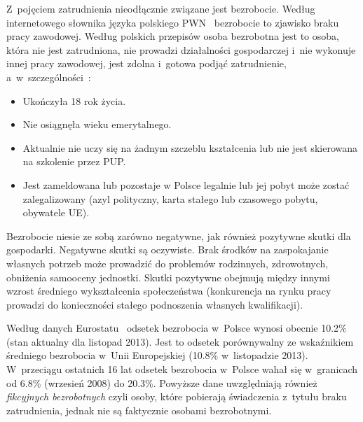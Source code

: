 \documentclass[12pt]{article}
\begin{document}
    Z~pojęciem zatrudnienia nieodłącznie związane jest bezrobocie. Według internetowego słownika języka polskiego PWN~\cite{sjp} bezrobocie to zjawisko braku pracy zawodowej. Według polskich przepisów osoba bezrobotna jest to osoba, która nie jest zatrudniona, nie prowadzi działalności gospodarczej i~nie wykonuje innej pracy zawodowej, jest zdolna i~gotowa podjąć zatrudnienie, a~w~szczególności~\cite{ust:pro:zat}:
    
    \begin{itemize}
        \item Ukończyła 18 rok życia.
        \item Nie osiągnęła wieku emerytalnego.
        \item Aktualnie nie uczy się na żadnym szczeblu kształcenia lub nie jest skierowana na szkolenie przez PUP.
        \item Jest zameldowana lub pozostaje w Polsce legalnie lub jej pobyt może zostać zalegalizowany (azyl polityczny, karta stałego lub czasowego pobytu, obywatele UE).
    \end{itemize}
    
    Bezrobocie niesie ze sobą zarówno negatywne, jak również pozytywne skutki dla gospodarki. Negatywne skutki są oczywiste. Brak środków na zaspokajanie własnych potrzeb może prowadzić do problemów rodzinnych, zdrowotnych, obniżenia samooceny jednostki. Skutki pozytywne obejmują między innymi wzrost średniego wykształcenia społeczeństwa (konkurencja na rynku pracy prowadzi do konieczności stałego podnoszenia własnych kwalifikacji).
    
    Według danych Eurostatu~\cite{eurostat} odsetek bezrobocia w~Polsce wynosi obecnie 10.2\% (stan aktualny dla listopad 2013). Jest to odsetek porównywalny ze wskaźnikiem średniego bezrobocia w~Unii Europejskiej (10.8\% w~listopadzie 2013). W~przeciągu ostatnich 16 lat odsetek bezrobocia w~Polsce wahał się w~granicach od 6.8\% (wrzesień 2008) do 20.3\%. Powyższe dane uwzględniają również \emph{fikcyjnych bezrobotnych} czyli osoby, które pobierają świadczenia z~tytułu braku zatrudnienia, jednak nie są faktycznie osobami bezrobotnymi.
    
\end{document}
